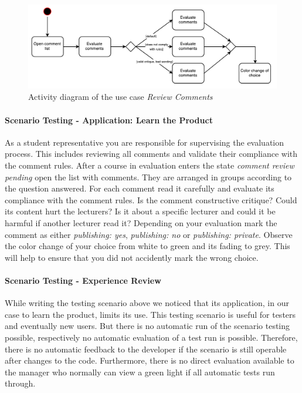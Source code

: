 \begin{figure}[h]
    \centering
    \includegraphics[width=\textwidth, keepaspectratio]{graphics/use-case}
    \caption{Activity diagram of the use case \emph{Review Comments}}
    \label{fig:activity-diagram}
\end{figure}

\paragraph{Scenario Testing - Application: Learn the Product}
As a student representative you are responsible for supervising the evaluation process.
This includes reviewing all comments and validate their compliance with the comment rules.
After a course in evaluation enters the state \emph{comment review pending} open the list with comments.
They are arranged in groups according to the question answered.
For each comment read it carefully and evaluate its compliance with the comment rules.
Is the comment constructive critique? 
Could its content hurt the lecturers? 
Is it about a specific lecturer and could it be harmful if another lecturer read it?
Depending on your evaluation mark the comment as either \emph{publishing: yes}, \emph{publishing: no} or \emph{publishing: private}.
Observe the color change of your choice from white to green and its fading to grey.
This will help to ensure that you did not accidently mark the wrong choice.

\paragraph{Scenario Testing - Experience Review}
While writing the testing scenario above we noticed that its application, in our case to learn the product, limits its use.
This testing scenario is useful for testers and eventually new users.
But there is no automatic run of the scenario testing possible, respectively no automatic evaluation of a test run is possible.
Therefore, there is no automatic feedback to the developer if the scenario is still operable after changes to the code.
Furthermore, there is no direct evaluation available to the manager who normally can view a green light if all automatic tests run through.


